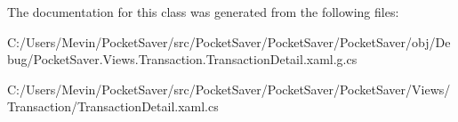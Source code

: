 The documentation for this class was generated from the following files\+:\begin{DoxyCompactItemize}
\item 
C\+:/\+Users/\+Mevin/\+Pocket\+Saver/src/\+Pocket\+Saver/\+Pocket\+Saver/\+Pocket\+Saver/obj/\+Debug/Pocket\+Saver.\+Views.\+Transaction.\+Transaction\+Detail.\+xaml.\+g.\+cs\item 
C\+:/\+Users/\+Mevin/\+Pocket\+Saver/src/\+Pocket\+Saver/\+Pocket\+Saver/\+Pocket\+Saver/\+Views/\+Transaction/Transaction\+Detail.\+xaml.\+cs\end{DoxyCompactItemize}
